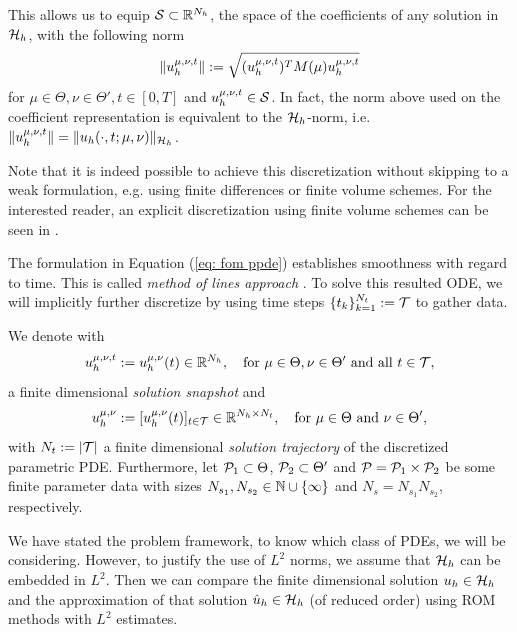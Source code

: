 This allows us to equip $\mathcal{S} \subset \mathbb{R}^{N_h}$, the space of the coefficients 
of any solution in $\mathcal{H}_h$, with the following
norm
\begin{equation} \label{eq: definition mass matrix norm}
    \lVert u_h^{\mu, \nu, t} \rVert := \sqrt{(u_h^{\mu, \nu, t})^T M(\mu) u_h^{\mu, \nu, t}}
\end{equation}
for $\mu \in \Theta, \nu \in \Theta', t \in [0, T]$ and $u_h^{\mu, \nu, t} \in \mathcal{S}$. In fact, 
the norm above used on the coefficient representation 
is equivalent to the $\mathcal{H}_h$-norm, i.e. $\lVert u_h^{\mu, \nu, t} \rVert = \lVert u_h(\cdot, t; \mu, \nu) \rVert_{\mathcal{H}_h}$.

Note that it is indeed possible to achieve this discretization without skipping to a weak formulation, e.g.
using finite differences or finite volume schemes. 
For the interested reader, an explicit discretization using finite volume
schemes can be seen in \cite{haasdonk2008pod}.

The formulation in Equation (\ref{eq: fom ppde}) establishes smoothness with regard to time. This is called
\emph{method of lines approach} \cite[p. 278]{hesthaven2022rb}. 
To solve this resulted ODE, we will implicitly further discretize by using time steps
$\{t_k\}_{k=1}^{N_t} := \mathcal{T}$ to gather data. 

\begin{definition} 
    \label{def: solution data}    
    We denote with
    \begin{equation*}
        u_h^{\mu, \nu, t} := u_h^{\mu, \nu}(t) \in \mathbb{R}^{N_h}, \quad \text{for }\mu \in \Theta, \nu \in \Theta' \text{ and all } t \in \mathcal{T},
    \end{equation*}
    a finite dimensional \emph{solution snapshot} and
    \begin{equation*}
        u_h^{\mu, \nu} := [u_h^{\mu, \nu}(t)]_{t \in \mathcal{T}} \in \mathbb{R}^{N_h \times N_t}, 
        \quad \text{for }\mu \in \Theta \text{ and } \nu \in \Theta',
    \end{equation*}
    with $N_t := \vert \mathcal{T} \vert$ a finite dimensional \emph{solution trajectory} of the discretized parametric PDE.
    Furthermore, let $\mathcal{P}_1 \subset \Theta$, $\mathcal{P}_2 \subset \Theta'$ and $\mathcal{P} = \mathcal{P}_1 \times
    \mathcal{P}_2$ be some finite parameter data with sizes $N_{s_1}, N_{s_2} \in \mathbb{N} \cup \{\infty\}$ and $N_s = N_{s_1} N_{s_2}$, 
    respectively.
\end{definition}


We have stated the problem framework, 
to know which class
of PDEs, we will be considering. However, to justify the
use of $L^2$ norms, we assume that $\mathcal{H}_h$ can be 
embedded in $L^2$. Then we can compare the finite dimensional solution $u_h \in \mathcal{H}_h$ 
and the approximation of that solution $\hat{u}_h \in \mathcal{H}_h$ (of reduced order) using ROM methods with $L^2$ estimates.

